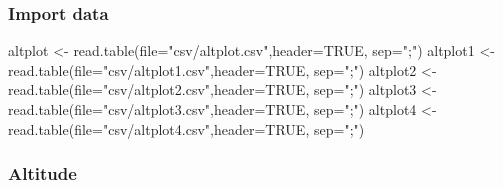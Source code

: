 \documentclass[
]{article}
\newenvironment{Shaded}{\begin{snugshade}}{\end{snugshade}}
\newcommand{\AttributeTok}[1]{\textcolor[rgb]{0.77,0.63,0.00}{#1}}
\newcommand{\ConstantTok}[1]{\textcolor[rgb]{0.00,0.00,0.00}{#1}}
\newcommand{\FunctionTok}[1]{\textcolor[rgb]{0.00,0.00,0.00}{#1}}
\newcommand{\NormalTok}[1]{#1}
\newcommand{\OtherTok}[1]{\textcolor[rgb]{0.56,0.35,0.01}{#1}}
\newcommand{\StringTok}[1]{\textcolor[rgb]{0.31,0.60,0.02}{#1}}
\begin{document}
\hypertarget{import-data}{%
\subsubsection{Import data}\label{import-data}}

\begin{Shaded}
\begin{Highlighting}[]
\NormalTok{altplot }\OtherTok{\textless{}{-}} \FunctionTok{read.table}\NormalTok{(}\AttributeTok{file=}\StringTok{"csv/altplot.csv"}\NormalTok{,}\AttributeTok{header=}\ConstantTok{TRUE}\NormalTok{, }\AttributeTok{sep=}\StringTok{";"}\NormalTok{)}
\NormalTok{altplot1 }\OtherTok{\textless{}{-}} \FunctionTok{read.table}\NormalTok{(}\AttributeTok{file=}\StringTok{"csv/altplot1.csv"}\NormalTok{,}\AttributeTok{header=}\ConstantTok{TRUE}\NormalTok{, }\AttributeTok{sep=}\StringTok{";"}\NormalTok{)}
\NormalTok{altplot2 }\OtherTok{\textless{}{-}} \FunctionTok{read.table}\NormalTok{(}\AttributeTok{file=}\StringTok{"csv/altplot2.csv"}\NormalTok{,}\AttributeTok{header=}\ConstantTok{TRUE}\NormalTok{, }\AttributeTok{sep=}\StringTok{";"}\NormalTok{)}
\NormalTok{altplot3 }\OtherTok{\textless{}{-}} \FunctionTok{read.table}\NormalTok{(}\AttributeTok{file=}\StringTok{"csv/altplot3.csv"}\NormalTok{,}\AttributeTok{header=}\ConstantTok{TRUE}\NormalTok{, }\AttributeTok{sep=}\StringTok{";"}\NormalTok{)}
\NormalTok{altplot4 }\OtherTok{\textless{}{-}} \FunctionTok{read.table}\NormalTok{(}\AttributeTok{file=}\StringTok{"csv/altplot4.csv"}\NormalTok{,}\AttributeTok{header=}\ConstantTok{TRUE}\NormalTok{, }\AttributeTok{sep=}\StringTok{";"}\NormalTok{)}
\end{Highlighting}
\end{Shaded}

\hypertarget{altitude}{%
\subsubsection{Altitude}\label{altitude}}
\end{document}
